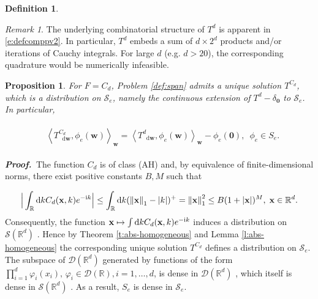 \documentclass[11pt,A4,twoside]{article}
\numberwithin{equation}{section}
\renewcommand*\d{\mathop{}\!\mathrm{d}}
\newcommand{\norml}[1]{\left\Vert#1 \right\Vert_{1}}
\newcommand{\inner}[1]{\left\langle#1 \right\rangle}
\newcommand{\x}{\mathbf{x}}
\newcommand{\w}{\mathbf{w}}
\newcommand{\R}{\mathbbm{R}}
\renewcommand{\S}{\mathcal{S}}
\newcommand{\D}{\mathcal{D}}
\def\bel{\begin{eqnarray*}\begin{aligned}}
\def\eel{\end{aligned}\end{eqnarray*}}
\newcommand{\beqa}{\begin{eqnarray}}
\newcommand{\eeqa}{\end{eqnarray}}
\def\bal{\begin{aligned}}
\def\eal{\end{aligned}}
\def\bll#1{
\beqa\label{#1}\bal
}\def\lel{\eal\eeqa}
\newcommand{\beql}[1]{\bll{#1}}
\newcommand{\eeql}{\lel}
\newtheorem{proposition}[theorem]{Proposition}
\theoremstyle{definition}
\newtheorem{definition}{Definition}[section]
\theoremstyle{remark}
\newtheorem{remark}{Remark}[section]
\def\sp{,\;}
\def\AHl{{\rm AHa}\xspace}\def\AHl{{\rm (AH)}\xspace}
\def\R{\mathbb{R}}
\def\proof{\noindent \emph{\textbf{Proof.} $\, $}}
\def\otimes{}
\def\bigotimes{\prod}
\def\thermi{{\rm i}}%
\begin{document}
\begin{definition}
{\begin{itemize}[leftmargin=30pt,topsep=1pt,itemsep=0pt,partopsep=0pt,parsep=0pt,listparindent=0pt]
    \end{itemize}
    }%
\end{definition}
\begin{remark}\label{r:dc-sol-combin}
The underlying combinatorial structure of $T^d$ is apparent in \eqref{e:defcomppv2}.  In particular, $T^d$ embeds a sum of $d \times 2^d $ products and/or iterations of Cauchy integrals. For large $d$ (e.g. $d>20$), the corresponding quadrature would be numerically infeasible. 
\end{remark}
 

\begin{proposition}\label{ex:1} For $F=C_d$, Problem \ref{def:span} admits a unique solution
$ T^{C_d}$, which is a distribution on $\S_e$, namely the continuous extension of $ T^d  - \delta_{\mathbf{0}}$ to $\S_e$. In particular,
\beql{e:TNt}
   & 
\inner{T^{C_d}_{\d \w},\phi_e(\w)}_{\w}=  \inner{T^d_{\d \w},\phi_e(\w)}_{\w}-\phi_e(\mathbf{0})\sp\  \phi_e \in S_e . \eeql  


\end{proposition} 
\proof The function $C_d$ is of class \AHl and, by equivalence of finite-dimensional norms, there exist positive constants $B,M$ such that
\beql{}
\Big|\int_\R \d k  C_d(\x,  k) e^{-\thermi k}\Big|\leq \int_\R \d k(\norml{\x}-|k|)^+ = \norml{\x}^2 \leq B(1+|\x|)^M\sp \x\in \R^d.
\eeql
Consequently, the function  $ \x\mapsto \int \d k  C_d(\x,  k) e^{-\thermi k}$ induces a distribution on $\S(\R^d)$ \citep[Eqn.\ (8.3.2) page 97]{friedlander1998introduction}. Hence by Theorem \ref{t:abs-homogeneous} and Lemma \ref{l:abs-homogeneous} the corresponding unique solution $T^{C_d}$ defines a distribution on $\S_e$.
The subspace of $\D(\R^d)$ generated by functions of the form $\prod_{i=1}^d\varphi_i(x_i),\, \varphi_i \in \D(\R), i=1,\dots,d$, is dense in $\D(\R^d)$ \citep[Lemma 2 page 181]{kanwal}, which itself is dense in $\S(\R^d)$ \citep[Remark page 140]{kanwal}.  As a result, $S_e$ is dense in $\S_e$. 
\end{document}
